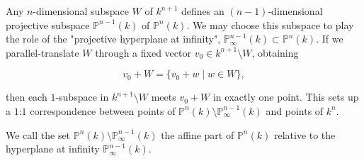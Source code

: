 Any $n$-dimensional subspace $W$ of $k^{n+1}$ defines an $(n-1)$-dimensional projective subspace $\mathbb{P}^{n-1}(k)$ of $\mathbb{P}^n(k)$. We may choose this subspace to play the role of the "projective hyperplane at infinity", $\mathbb{P}_{\infty}^{n-1}(k) \subset \mathbb{P}^n(k)$. If we parallel-translate $W$ through a fixed vector $v_0 \in k^{n+1} \setminus W$, obtaining

$$v_0 + W = \{v_0 + w \mid w \in W\},$$

then each $1$-subspace in $k^{n+1} \setminus W$ meets $v_0 + W$ in exactly one point. This sets up a $1$:$1$ correspondence between points of $\mathbb{P}^n(k) \setminus \mathbb{P}_{\infty}^{n-1}(k)$ and points of $k^n$.

We call the set $\mathbb{P}^n(k) \setminus \mathbb{P}_{\infty}^{n-1}(k)$ the affine part of $\mathbb{P}^n(k)$ relative to the hyperplane at infinity $\mathbb{P}_{\infty}^{n-1}(k)$.
